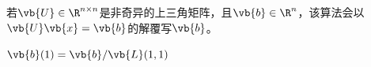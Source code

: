 \begin{BoxAlgorithm}[列主序的反向代换]
    若$\vb{U}\in\R^{n\times n}$是非奇异的上三角矩阵，且$\vb{b}\in\R^{n}$，该算法会以$\vb{U}\vb{x}=\vb{b}$的解覆写$\vb{b}$。
    \begin{Algoplain}
        $\vb{b}(1)=\vb{b}/\vb{L}(1,1)$\;
    \end{Algoplain}
\end{BoxAlgorithm}
